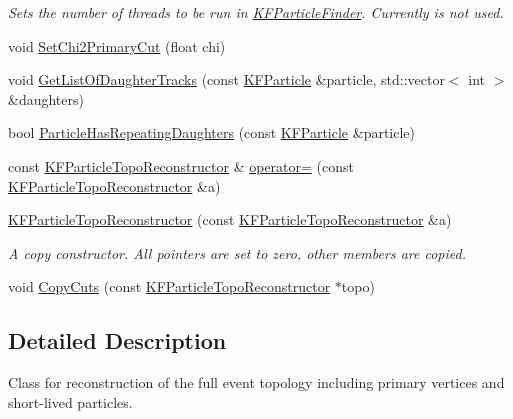 \begin{DoxyCompactItemize}
\begin{DoxyCompactList}\small\item\em Sets the number of threads to be run in \hyperlink{classKFParticleFinder}{K\+F\+Particle\+Finder}. Currently is not used. \end{DoxyCompactList}\item 
void \hyperlink{classKFParticleTopoReconstructor_a90d4aac41e9eb0c47ec0ff279a7275fb}{Set\+Chi2\+Primary\+Cut} (float chi)
\item 
void \hyperlink{classKFParticleTopoReconstructor_a20260f5cceb5f45a532d041f548c427c}{Get\+List\+Of\+Daughter\+Tracks} (const \hyperlink{classKFParticle}{K\+F\+Particle} \&particle, std\+::vector$<$ int $>$ \&daughters)
\item 
bool \hyperlink{classKFParticleTopoReconstructor_a63af58bb4614ff7a1a72b24fd16f018d}{Particle\+Has\+Repeating\+Daughters} (const \hyperlink{classKFParticle}{K\+F\+Particle} \&particle)
\item 
const \hyperlink{classKFParticleTopoReconstructor}{K\+F\+Particle\+Topo\+Reconstructor} \& \hyperlink{classKFParticleTopoReconstructor_a39b427b162c66c56ddbf0dd44b1b1cbd}{operator=} (const \hyperlink{classKFParticleTopoReconstructor}{K\+F\+Particle\+Topo\+Reconstructor} \&a)
\item 
\hyperlink{classKFParticleTopoReconstructor_acd1e5396b73c2dfa73a4520b806c1dd4}{K\+F\+Particle\+Topo\+Reconstructor} (const \hyperlink{classKFParticleTopoReconstructor}{K\+F\+Particle\+Topo\+Reconstructor} \&a)\hypertarget{classKFParticleTopoReconstructor_acd1e5396b73c2dfa73a4520b806c1dd4}{}\label{classKFParticleTopoReconstructor_acd1e5396b73c2dfa73a4520b806c1dd4}

\begin{DoxyCompactList}\small\item\em A copy constructor. All pointers are set to zero, other members are copied. \end{DoxyCompactList}\item 
void \hyperlink{classKFParticleTopoReconstructor_a56ffc1ca83e49eb29d8cfc67e1e79fda}{Copy\+Cuts} (const \hyperlink{classKFParticleTopoReconstructor}{K\+F\+Particle\+Topo\+Reconstructor} $\ast$topo)
\end{DoxyCompactItemize}


\subsection{Detailed Description}
Class for reconstruction of the full event topology including primary vertices and short-\/lived particles. 

